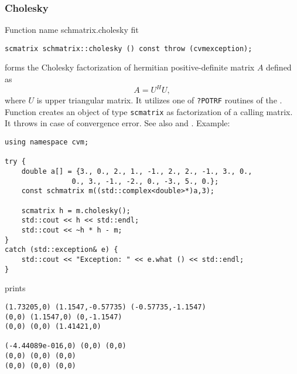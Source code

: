 \subsubsection{Cholesky}
Function%
\pdfdest name {schmatrix.cholesky} fit
\begin{verbatim}
scmatrix schmatrix::cholesky () const throw (cvmexception);
\end{verbatim}
forms the Cholesky factorization of  hermitian positive-definite 
matrix $A$ defined as
\begin{equation*}
A=U^H U,
\end{equation*}
where $U$ is upper triangular matrix.
It utilizes one of \verb"?POTRF" routines of the
.
Function
creates an object of type \verb"scmatrix" as 
 factorization of a calling matrix.
It throws  
in case of convergence error.
See also
 and
.
Example:
\begin{Verbatim}
using namespace cvm;

try {
    double a[] = {3., 0., 2., 1., -1., 2., 2., -1., 3., 0.,
                0., 3., -1., -2., 0., -3., 5., 0.};
    const schmatrix m((std::complex<double>*)a,3);
    
    scmatrix h = m.cholesky();
    std::cout << h << std::endl;
    std::cout << ~h * h - m;
}
catch (std::exception& e) {
    std::cout << "Exception: " << e.what () << std::endl;
}
\end{Verbatim}
prints
\begin{Verbatim}
(1.73205,0) (1.1547,-0.57735) (-0.57735,-1.1547)
(0,0) (1.1547,0) (0,-1.1547)
(0,0) (0,0) (1.41421,0)

(-4.44089e-016,0) (0,0) (0,0)
(0,0) (0,0) (0,0)
(0,0) (0,0) (0,0)
\end{Verbatim}
\newpage



